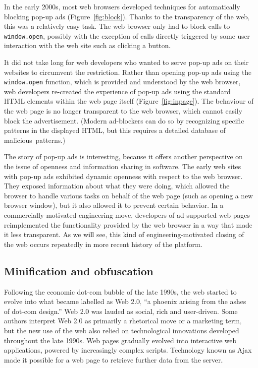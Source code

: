 In the early 2000s, most web browsers developed techniques for automatically blocking pop-up ads
(Figure~\ref{fig:block}). Thanks to the transparency of the web, this was a relatively
easy task. The web browser only had to block calls to \texttt{window.open}, possibly with the
exception of calls directly triggered by some user interaction with the web site such as
clicking a button.

It did not take long for web developers who wanted to serve pop-up ads on their websites to
circumvent the restriction. Rather than opening pop-up ads using the \texttt{window.open}
function, which is provided and understood by the web browser, web developers re-created the
experience of pop-up ads using the standard HTML elements within the web page itself
(Figure~\ref{fig:inpage}). The behaviour of the web page is no longer transparent
to the web browser, which cannot easily block the advertisement. (Modern ad-blockers
can do so by recognizing specific patterns in the displayed HTML, but this requires a
detailed database of malicious~patterns.)

The story of pop-up ads is interesting, because it offers another perspective on the issue of
openness and information sharing in software. The early web sites with pop-up ads exhibited
dynamic openness with respect to the web browser. They exposed information about what
they were doing, which allowed the browser to handle various tasks on behalf of the web page
(such as opening a new browser window), but it also allowed it to prevent certain behavior.
In a commercially-motivated engineering move, developers of ad-supported web pages reimplemented
the functionality provided by the web browser in a way that made it less transparent.
As we will see, this kind of engineering-motivated closing of the web occurs repeatedly in more
recent history of the platform.

\subsection{Minification and obfuscation}
Following the economic dot-com bubble of the late 1990s, the web started to evolve into what
became labelled as Web 2.0, ``a phoenix arising from the ashes of dot-com design.''
Web 2.0 was lauded as social, rich and user-driven. Some authors interpret Web 2.0 as primarily
a rhetorical move or a marketing term, but the new use of the web
also relied on technological innovations developed throughout the late 1990s.
Web pages gradually evolved into interactive web applications, powered by increasingly
complex scripts. Technology known as Ajax made it possible for a web page to
retrieve further data from the server.

